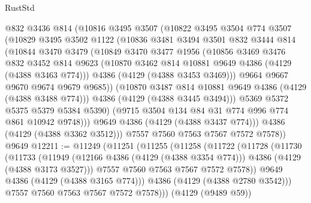 \begin{lexlean}{RustStd}
\begin{coremodule}
            @832
            @3436
            @814
            (@10816
              @3495
              @3507
              (@10822
                @3495
                @3504
                @774
                @3507
                (@10829
                  @3495
                  @3502
                  @1122
                  (@10836
                    @3481
                    @3494
                    @3501
                    @832
                    @3444
                    @814
                    (@10844
                      @3470
                      @3479
                      (@10849
                        @3470
                        @3477
                        @1956
                        (@10856
                          @3469
                          @3476
                          @832
                          @3452
                          @814
                          @9623
                          (@10870 @3462 @814 @10881 @9649 @4386 (@4129 (@4388 @3463 @774)))
                          @4386
                          (@4129 (@4388 @3453 @3469)))
                        @9664
                        @9667
                        @9670
                        @9674
                        @9679
                        @9685))
                    (@10870 @3487 @814 @10881 @9649 @4386 (@4129 (@4388 @3488 @774)))
                    @4386
                    (@4129 (@4388 @3445 @3494)))
                  @5369
                  @5372
                  @5375
                  @5379
                  @5384
                  @5390)
                (@9715 @3504 @134 @84 @31 @774 @996 @774 @861 @10942 @9748)))
            @9649
            @4386
            (@4129 (@4388 @3437 @774)))
          @4386
          (@4129 (@4388 @3362 @3512)))
        @7557
        @7560
        @7563
        @7567
        @7572
        @7578))
    @9649
@12211 := @11249
    (@11251
      (@11255
        (@11258
          (@11722
            (@11728
              (@11730
                (@11733
                  (@11949
                    (@12166 @4386 (@4129 (@4388 @3354 @774)))
                    @4386
                    (@4129 (@4388 @3173 @3527)))
                  @7557
                  @7560
                  @7563
                  @7567
                  @7572
                  @7578))
              @9649
              @4386
              (@4129 (@4388 @3165 @774)))
            @4386
            (@4129 (@4388 @2780 @3542)))
          @7557
          @7560
          @7563
          @7567
          @7572
          @7578)))
    (@4129 (@9489 @59))

\end{coremodule}
\end{lexlean}
